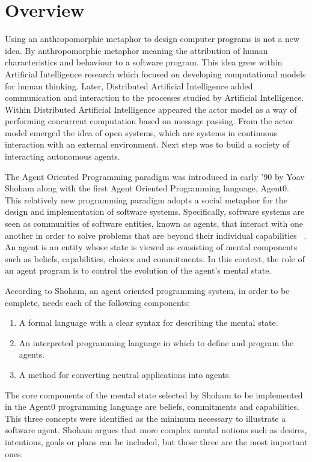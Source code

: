 \documentclass[a4paper,12pt,oneside,fleqn]{book} %
\begin{document}
\section{Overview} %

Using an anthropomorphic metaphor to design computer programs is not a new
idea. By anthropomorphic metaphor meaning the attribution of human
characteristics and behaviour to a software program. This idea grew within
Artificial Intelligence research which focused on developing computational
models for human thinking. Later, Distributed Artificial Intelligence added
communication and interaction to the processes studied by Artificial
Intelligence.  Within Distributed Artificial Intelligence appeared the
actor model as a way of performing concurrent computation based on message
passing. From the actor model emerged the idea of open systems, which are
systems in continuous interaction with an external environment. Next step
was to build a society of interacting autonomous agents.

The Agent Oriented Programming paradigm was introduced in early '90 by Yoav
Shoham along with the first Agent Oriented Programming language, Agent0.
This relatively new programming paradigm adopts a social metaphor for the
design and implementation of software systems. Specifically, software
systems are seen as communities of software entities, known as agents, that
interact with one another in order to solve problems that are beyond their
individual capabilities ~\cite{DBLP:journals/ai/Shoham93}. An agent
is an entity whose state is viewed as consisting of mental components such
as beliefs, capabilities, choices and commitments. In this context, the role
of an agent program is to control the evolution of the agent's mental
state.

According to Shoham, an agent oriented programming system, in order to be
complete, needs each of the following components:
\begin{enumerate}
   \item A formal language with a clear syntax for describing the mental state.
   \item An interpreted programming language in which to define and program the agents.
   \item A method for converting neutral applications into agents.
\end{enumerate}

The core components of the mental state selected by Shoham to be
implemented in the Agent0 programming language are beliefs, commitments and
capabilities. This three concepts were identified as the minimum necessary
to illustrate a software agent. Shoham argues that more complex mental
notions such as desires, intentions, goals or plans can be included, but
those three are the most important ones.
\end{document}
